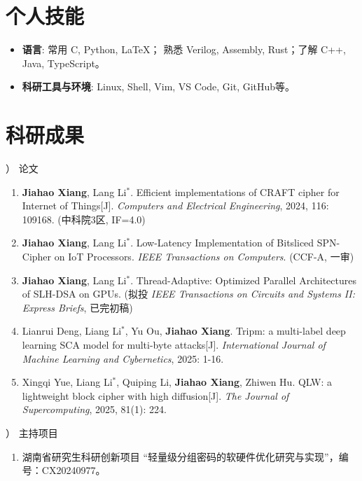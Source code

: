 \documentclass[12pt,a4paper]{article}
\begin{document}
\section*{个人技能}
{
  \begin{itemize}[leftmargin=2em]
    \item \textbf{语言}: 常用 C, Python, \LaTeX； 熟悉 Verilog, Assembly, Rust；了解 C++, Java, TypeScript。
    \item \textbf{科研工具与环境}: Linux, Shell, Vim, VS Code, Git, GitHub等。
  \end{itemize}
}

\section*{科研成果}
） 论文
\begin{enumerate}[leftmargin=2em]
  \item \textbf{Jiahao Xiang}, Lang Li$^*$. Efficient implementations of CRAFT cipher for Internet of Things[J]. \textit{Computers and Electrical Engineering}, 2024, 116: 109168. (中科院3区, IF=4.0)
  \item \textbf{Jiahao Xiang}, Lang Li$^*$. Low-Latency Implementation of Bitsliced SPN-Cipher on IoT Processors. \textit{IEEE Transactions on Computers}. (CCF-A, 一审)
  \item \textbf{Jiahao Xiang}, Lang Li$^*$. Thread-Adaptive: Optimized Parallel Architectures of SLH-DSA on GPUs. (拟投 \textit{IEEE Transactions on Circuits and Systems II: Express Briefs}, 已完初稿)
  \item Lianrui Deng, Liang Li$^*$, Yu Ou, \textbf{Jiahao Xiang}. Tripm: a multi-label deep learning SCA model for multi-byte attacks[J]. \textit{International Journal of Machine Learning and Cybernetics}, 2025: 1-16.
  \item Xingqi Yue, Liang Li$^*$, Quiping Li, \textbf{Jiahao Xiang}, Zhiwen Hu. QLW: a lightweight block cipher with high diffusion[J]. \textit{The Journal of Supercomputing}, 2025, 81(1): 224.
\end{enumerate}

） 主持项目

\begin{enumerate}[leftmargin=2em]
  \item 湖南省研究生科研创新项目 ``轻量级分组密码的软硬件优化研究与实现''，编号：CX20240977。
\end{enumerate}
\end{document}
